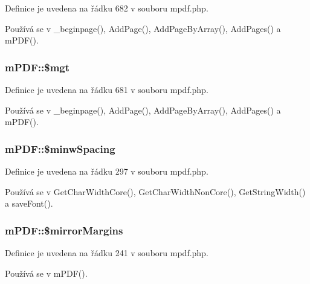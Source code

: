 Definice je uvedena na řádku 682 v souboru mpdf.\-php.



Používá se v \-\_\-beginpage(), Add\-Page(), Add\-Page\-By\-Array(), Add\-Pages() a m\-P\-D\-F().

\hypertarget{classm_p_d_f_a80fb6dc0cec8c1edaddfa87f47589abc}{
\subsubsection[{\$mgt}]{\setlength{\rightskip}{0pt plus 5cm}m\-P\-D\-F\-::\$mgt}}\label{classm_p_d_f_a80fb6dc0cec8c1edaddfa87f47589abc}


Definice je uvedena na řádku 681 v souboru mpdf.\-php.



Používá se v \-\_\-beginpage(), Add\-Page(), Add\-Page\-By\-Array(), Add\-Pages() a m\-P\-D\-F().

\hypertarget{classm_p_d_f_a2d19fe5b429cb195443d9a908ca70cea}{
\subsubsection[{\$minw\-Spacing}]{\setlength{\rightskip}{0pt plus 5cm}m\-P\-D\-F\-::\$minw\-Spacing}}\label{classm_p_d_f_a2d19fe5b429cb195443d9a908ca70cea}


Definice je uvedena na řádku 297 v souboru mpdf.\-php.



Používá se v Get\-Char\-Width\-Core(), Get\-Char\-Width\-Non\-Core(), Get\-String\-Width() a save\-Font().

\hypertarget{classm_p_d_f_ad0582b2bc47f919ae419b3ce52679287}{
\subsubsection[{\$mirror\-Margins}]{\setlength{\rightskip}{0pt plus 5cm}m\-P\-D\-F\-::\$mirror\-Margins}}\label{classm_p_d_f_ad0582b2bc47f919ae419b3ce52679287}


Definice je uvedena na řádku 241 v souboru mpdf.\-php.



Používá se v m\-P\-D\-F().

